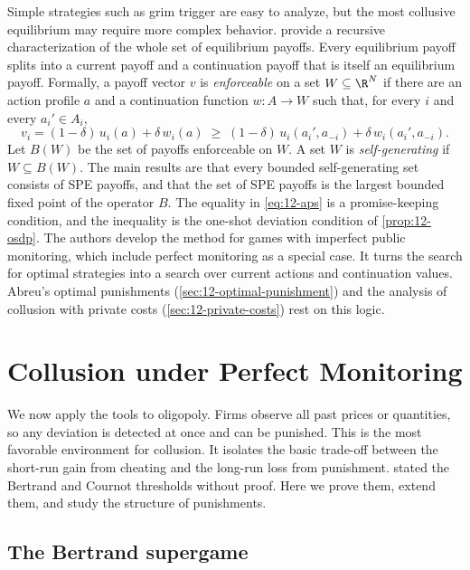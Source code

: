 Simple strategies such as grim trigger are easy to analyze, but the most collusive equilibrium may require more
complex behavior. \citet{AbreuPearceStacchetti1990} provide a recursive characterization of the whole set of
equilibrium payoffs. Every equilibrium payoff splits into a current payoff and a continuation payoff that is itself an
equilibrium payoff. Formally, a payoff vector $v$ is \emph{enforceable} on a set $W \subseteq \R^N$ if there are an
action profile $a$ and a continuation function $w: A \to W$ such that, for every $i$ and every $a_i' \in A_i$,
\begin{equation}\label{eq:12-aps}
v_i = (1 - \delta)\,u_i(a) + \delta\,w_i(a) \;\ge\; (1 - \delta)\,u_i(a_i', a_{-i}) + \delta\,w_i(a_i', a_{-i}) .
\end{equation}
Let $B(W)$ be the set of payoffs enforceable on $W$. A set $W$ is \emph{self-generating} if $W \subseteq B(W)$. The
main results are that every bounded self-generating set consists of SPE payoffs, and that the set of SPE payoffs is
the largest bounded fixed point of the operator $B$. The equality in \eqref{eq:12-aps} is a promise-keeping
condition, and the inequality is the one-shot deviation condition of \cref{prop:12-osdp}. The authors develop the
method for games with imperfect public monitoring, which include perfect monitoring as a special case. It turns the
search for optimal strategies into a search over current actions and continuation values. Abreu's optimal
punishments (\cref{sec:12-optimal-punishment}) and the analysis of collusion with private costs
(\cref{sec:12-private-costs}) rest on this logic.

\section{Collusion under Perfect Monitoring}\label{sec:12-perfect}

We now apply the tools to oligopoly. Firms observe all past prices or quantities, so any deviation is detected at once
and can be punished. This is the most favorable environment for collusion. It isolates the basic trade-off between
the short-run gain from cheating and the long-run loss from punishment.  stated the Bertrand and
Cournot thresholds without proof. Here we prove them, extend them, and study the structure of punishments.

\subsection{The Bertrand supergame}\label{sec:12-bertrand}


